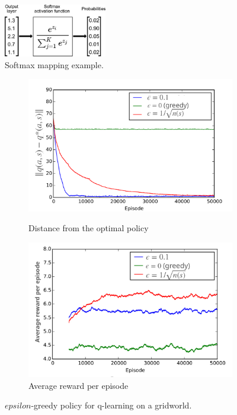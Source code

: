 \documentclass[11pt]{book} %
\begin{document}
\begin{figure}[ht]
    \centering
    \includegraphics[width=0.4\textwidth]{./Figs/softmax_example.jpeg}
    \caption{Softmax mapping example.}
    \label{fig:softmax}
\end{figure}

\begin{figure}[ht]
    \begin{subfigure}[b]{0.48\textwidth}
        \centering
        \includegraphics[width=\textwidth]{./Figs/epsilon_greedy_q2.jpeg}
        \label{fig:epsilon_greedy}
        \caption{Distance from the optimal policy}
    \end{subfigure}
    \begin{subfigure}[b]{0.5\textwidth}
        \centering
        \includegraphics[width=\textwidth]{./Figs/epsilon_greedy_q.jpeg}
        \caption{Average reward per episode}
        \label{fig:softmax}
    \end{subfigure}
    \label{fig:exploration}
    \caption{$epsilon$-greedy policy for q-learning on a gridworld.}  
\end{figure}
\end{document}
